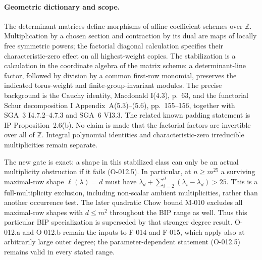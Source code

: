\paragraph{Geometric dictionary and scope.}
The determinant matrices define morphisms of affine coefficient
schemes over $\mathbb Z$. Multiplication by a chosen section
and contraction by its dual are maps of locally free symmetric
powers; the factorial diagonal calculation specifies their
characteristic-zero effect on all highest-weight copies.
The stabilization is a calculation in the coordinate algebra
of the matrix scheme: a determinant-line factor, followed by
division by a common first-row monomial, preserves the indicated
torus-weight and finite-group-invariant modules. The precise
background is the Cauchy identity, Macdonald I(4.3), p.~63,
and the functorial Schur decomposition I Appendix~A(5.3)--(5.6),
pp.~155--156, together with SGA~3 I4.7.2--4.7.3 and SGA~6
VI3.3. The related known padding statement is IP Proposition~2.6(b).
No claim is made that the factorial factors are invertible over
all of $\mathbb Z$. Integral polynomial identities and
characteristic-zero irreducible multiplicities remain separate.

The new gate is exact: a shape in this stabilized class can
only be an actual multiplicity obstruction if it fails
(O-012.5). In particular, at $n\geq m^{25}$ a surviving
maximal-row shape $\ell(\lambda)=d$ must have
$\lambda_d+\sum_{i=2}^d(\lambda_i-\lambda_d)>25$.
This is a full-multiplicity exclusion, including non-scalar
ambient multiplicities, rather than another occurrence test.
The later quadratic Chow bound M-010 excludes all maximal-row
shapes with $d\leq m^2$ throughout the BIP range as well.
Thus this particular BIP specialization is superseded by that
stronger degree result. O-012.a and O-012.b remain the inputs
to F-014 and F-015, which apply also at arbitrarily large outer
degree; the parameter-dependent statement (O-012.5) remains
valid in every stated range.
